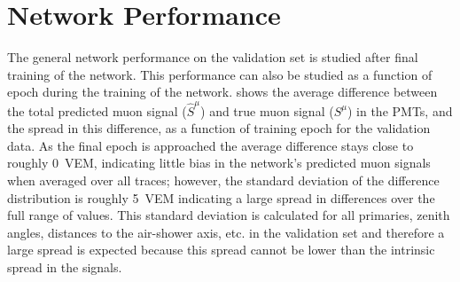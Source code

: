 








\section{Network Performance}\label{sec:performance}
The general network performance on the validation set is studied after final training of the network.
This performance can also be studied as a function of epoch during the training of the network.
 shows the average difference between the total predicted muon signal ($\hat{S}^{\mu}$) and true muon signal ($S^{\mu}$) in the PMTs, and the spread in this difference, as a function of training epoch for the validation data.
As the final epoch is approached the average difference stays close to roughly \qty{0}{VEM}, indicating little bias in the network's predicted muon signals when averaged over all traces; however, the standard deviation of the difference distribution is roughly \qty{5}{VEM} indicating a large spread in differences over the full range of values.
This standard deviation is calculated for all primaries, zenith angles, distances to the air-shower axis, etc. in the validation set and therefore a large spread is expected because this spread cannot be lower than the intrinsic spread in the signals.


